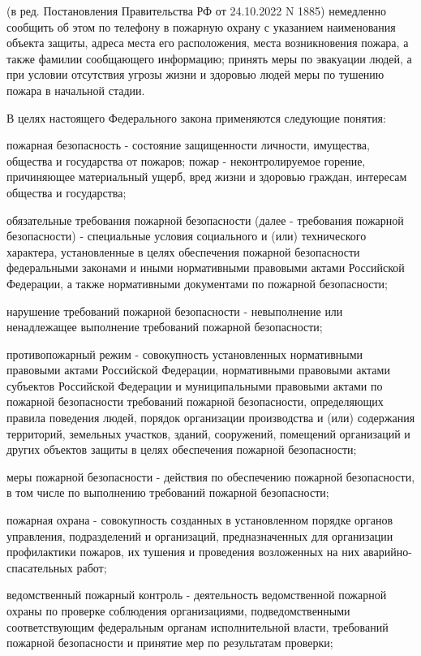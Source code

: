 \documentclass[a4paper, 12pt]{article}
\theoremstyle{definition}
\begin{document}
        (в ред. Постановления Правительства РФ от 24.10.2022 N 1885)
        немедленно сообщить об этом по телефону в пожарную охрану с указанием наименования объекта защиты, адреса места его расположения, места возникновения пожара, а также фамилии сообщающего информацию;
        принять меры по эвакуации людей, а при условии отсутствия угрозы жизни и здоровью людей меры по тушению пожара в начальной стадии.

        В целях настоящего Федерального закона применяются следующие понятия:

        пожарная безопасность - состояние защищенности личности, имущества, общества и государства от пожаров;
        пожар - неконтролируемое горение, причиняющее материальный ущерб, вред жизни и здоровью граждан, интересам общества и государства;
        
        обязательные требования пожарной безопасности (далее - требования пожарной безопасности) - специальные условия социального и (или) технического характера, установленные в целях обеспечения пожарной безопасности федеральными законами и иными нормативными правовыми актами Российской Федерации, а также нормативными документами по пожарной безопасности;

        нарушение требований пожарной безопасности - невыполнение или ненадлежащее выполнение требований пожарной безопасности;

        противопожарный режим - совокупность установленных нормативными правовыми актами Российской Федерации, нормативными правовыми актами субъектов Российской Федерации и муниципальными правовыми актами по пожарной безопасности требований пожарной безопасности, определяющих правила поведения людей, порядок организации производства и (или) содержания территорий, земельных участков, зданий, сооружений, помещений организаций и других объектов защиты в целях обеспечения пожарной безопасности;

        меры пожарной безопасности - действия по обеспечению пожарной безопасности, в том числе по выполнению требований пожарной безопасности;

        пожарная охрана - совокупность созданных в установленном порядке органов управления, подразделений и организаций, предназначенных для организации профилактики пожаров, их тушения и проведения возложенных на них аварийно-спасательных работ;

        ведомственный пожарный контроль - деятельность ведомственной пожарной охраны по проверке соблюдения организациями, подведомственными соответствующим федеральным органам исполнительной власти, требований пожарной безопасности и принятие мер по результатам проверки;
\end{document}
